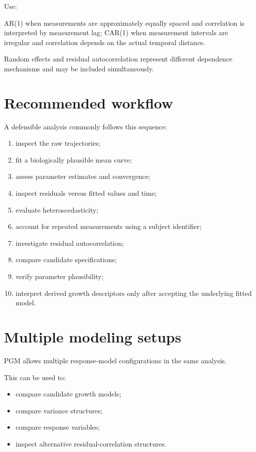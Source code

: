 \documentclass[
  english,
  letterpaper,
  DIV=11,
  numbers=noendperiod]{scrreprt}
\begin{document}
Use:

AR(1) when measurements are approximately equally spaced and correlation
is interpreted by measurement lag; CAR(1) when measurement intervals are
irregular and correlation depends on the actual temporal distance.

Random effects and residual autocorrelation represent different
dependence mechanisms and may be included simultaneously.

\section{Recommended workflow}\label{recommended-workflow}

A defensible analysis commonly follows this sequence:

\begin{enumerate}
\def\labelenumi{\arabic{enumi}.}
\item
  inspect the raw trajectories;
\item
  fit a biologically plausible mean curve;
\item
  assess parameter estimates and convergence;
\item
  inspect residuals versus fitted values and time;
\item
  evaluate heteroscedasticity;
\item
  account for repeated measurements using a subject identifier;
\item
  investigate residual autocorrelation;
\item
  compare candidate specifications;
\item
  verify parameter plausibility;
\item
  interpret derived growth descriptors only after accepting the
  underlying fitted model.
\end{enumerate}

\section{Multiple modeling setups}\label{multiple-modeling-setups}

PGM allows multiple response-model configurations in the same analysis.

This can be used to:

\begin{itemize}
\item
  compare candidate growth models;
\item
  compare variance structures;
\item
  compare response variables;
\item
  inspect alternative residual-correlation structures.
\end{itemize}
\end{document}

